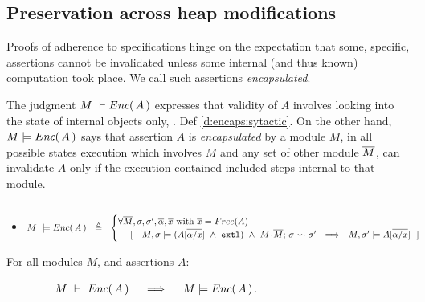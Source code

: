 \subsection{Preservation across heap modifications}

 
Proofs of adherence to {\SpecLang specifications  hinge on the expectation that some,  specific, assertions cannot be invalidated unless some 
} internal (and thus known) computation took place. 
{We call such assertions   \emph{encapsulated}.}
 

The judgment $M\ \vdash {\ensuremath Enc(\, A\, )}$  expresses that validity of $A$ involves looking into the state of  
internal objects only,  \cf. Def \ref{d:encaps:sytactic}.
{On the other hand, $M  \models {\ensuremath Enc(\, A\, )}$ says that assertion $A$  is  \emph{encapsulated} by a module $M$, \ie in all possible states %
execution which involves $M$ and any set of other module $\overline{M}$, can invalidate   $A$ only if the execution contained included steps internal to that module}.
 

\begin{definition} $~$ \\
\label{d:encaps}
\begin{itemize}
\item
$ %
    M\ \models \encaps{A}\ \   \triangleq  \ \   
    \begin{cases}
     \forall \Mtwo, \sigma, \sigma',  \overline{\alpha}, \overline{x} \mbox{ with } \overline{x}=Free(A)\\ %
   \ \ \ \  [\ \ \  \satisfiesA{M}{\sigma}{({A[{\overline {\alpha/x}}]} \ \wedge\ \externalexec)}\  \wedge\ { \leadstoBounded {M\madd\Mtwo}  {\sigma}{\sigma'}} %
   \ \ \Longrightarrow\ \ 
   {M},{\sigma'}\models{A[{\overline {\alpha/x}}]} \ \  ]
    \end{cases}
 $%
 \end{itemize}
  \end{definition}
  
 
  \begin{lemma}
\label{lem:encap-soundness}
For all modules $M$, and assertions $A$: 

$\strut \hspace{1.5cm} M\ \vdash\ {Enc(\, A\, )} \ \ \ \ \Longrightarrow\ \ \ \ M \models {\ensuremath Enc(\, A\, )}$.
\end{lemma}

